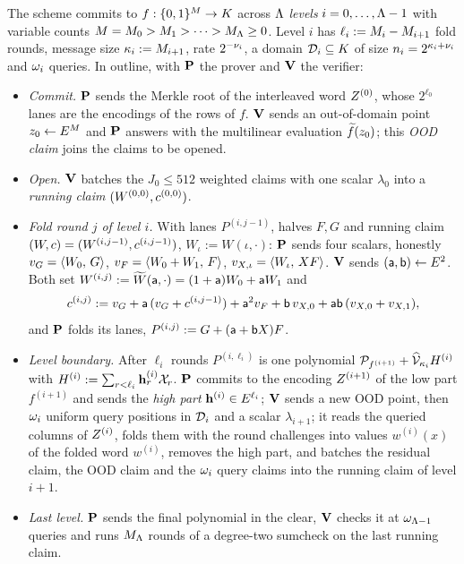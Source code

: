 The scheme commits to $f:\{0,1\}^{M}\to K$ across $\Lambda$ \emph{levels} $i=0,\dots,\Lambda-1$ with variable counts $M=M_0>M_1>\dots>M_\Lambda\ge0$. Level $i$ has $\ell_i:=M_i-M_{i+1}$ fold rounds, message size $\kappa_i:=M_{i+1}$, rate $2^{-\nu_i}$, a domain $\mathcal{D}_i\subseteq K$ of size $n_i=2^{\kappa_i+\nu_i}$ and $\omega_i$ queries. In outline, with $\mathbf{P}$ the prover and $\mathbf{V}$ the verifier:
\begin{itemize}[itemsep=1pt,topsep=2pt]
\item \emph{Commit.} $\mathbf{P}$ sends the Merkle root of the interleaved word $Z^{(0)}$, whose $2^{\ell_0}$ lanes are the encodings of the rows of $f$. $\mathbf{V}$ sends an out-of-domain point $z_0\leftarrow E^{M}$ and $\mathbf{P}$ answers with the multilinear evaluation $\widetilde{f}(z_0)$; this \emph{OOD claim} joins the claims to be opened.
\item \emph{Open.} $\mathbf{V}$ batches the $J_0\le512$ weighted claims with one scalar $\lambda_0$ into a \emph{running claim} $(W^{(0,0)},c^{(0,0)})$.
\item \emph{Fold round $j$ of level $i$.} With lanes $P^{(i,j-1)}$, halves $F,G$ and running claim $(W,c)=(W^{(i,j-1)},c^{(i,j-1)})$, $W_\iota:=W(\iota,\cdot)$: $\mathbf{P}$ sends four scalars, honestly $v_G=\langle W_0,\, G \rangle$, $v_F=\langle W_0+W_1,\, F \rangle$, $v_{X,\iota}=\langle W_\iota,\, XF \rangle$. $\mathbf{V}$ sends $(\mathsf{a},\mathsf{b})\leftarrow E^2$. Both set $W^{(i,j)}:=\widetilde{W}(\mathsf{a},\cdot)=(1+\mathsf{a})W_0+\mathsf{a} W_1$ and
\begin{equation}\label{eq:claim-update}
c^{(i,j)}:=v_G+\mathsf{a}\,(v_G+c^{(i,j-1)})+\mathsf{a}^2v_F+\mathsf{b}\,v_{X,0}+\mathsf{a}\mathsf{b}\,(v_{X,0}+v_{X,1}),
\end{equation}
and $\mathbf{P}$ folds its lanes, $P^{(i,j)}:=G+(\mathsf{a}+\mathsf{b} X)F$.
\item \emph{Level boundary.} After $\ell_i$ rounds $P^{(i,\ell_i)}$ is one polynomial $\mathcal{P}_{f^{(i+1)}}+\widehat{\mathcal{V}}_{\kappa_i}H^{(i)}$ with $H^{(i)}:=\sum_{r<\ell_i}\mathbf{h}^{(i)}_r\mathcal{X}_r$. $\mathbf{P}$ commits to the encoding $Z^{(i+1)}$ of the low part $f^{(i+1)}$ and sends the \emph{high part} $\mathbf{h}^{(i)}\in E^{\ell_i}$; $\mathbf{V}$ sends a new OOD point, then $\omega_i$ uniform query positions in $\mathcal{D}_i$ and a scalar $\lambda_{i+1}$; it reads the queried columns of $Z^{(i)}$, folds them with the round challenges into values $w^{(i)}(x)$ of the folded word $w^{(i)}$, removes the high part, and batches the residual claim, the OOD claim and the $\omega_i$ query claims into the running claim of level $i+1$.
\item \emph{Last level.} $\mathbf{P}$ sends the final polynomial in the clear, $\mathbf{V}$ checks it at $\omega_{\Lambda-1}$ queries and runs $M_\Lambda$ rounds of a degree-two sumcheck on the last running claim.
\end{itemize}

